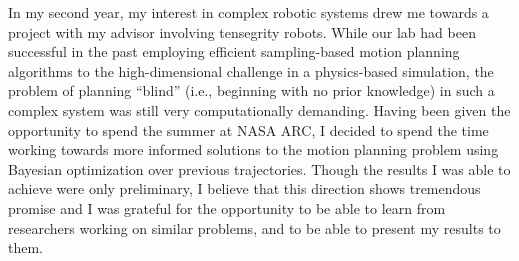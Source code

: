 In my second year, my interest in complex robotic systems drew me towards a project with my advisor involving tensegrity robots. While our lab had been successful in the past employing efficient sampling-based motion planning algorithms to the high-dimensional challenge in a physics-based simulation, the problem of planning ``blind'' (i.e., beginning with no prior knowledge) in such a complex system was still very computationally demanding. Having been given the opportunity to spend the summer at NASA ARC, I decided to spend the time working towards more informed solutions to the motion planning problem using Bayesian optimization over previous trajectories. Though the results I was able to achieve were only preliminary, I believe that this direction shows tremendous promise and I was grateful for the opportunity to be able to learn from researchers working on similar problems, and to be able to present my results to them. 